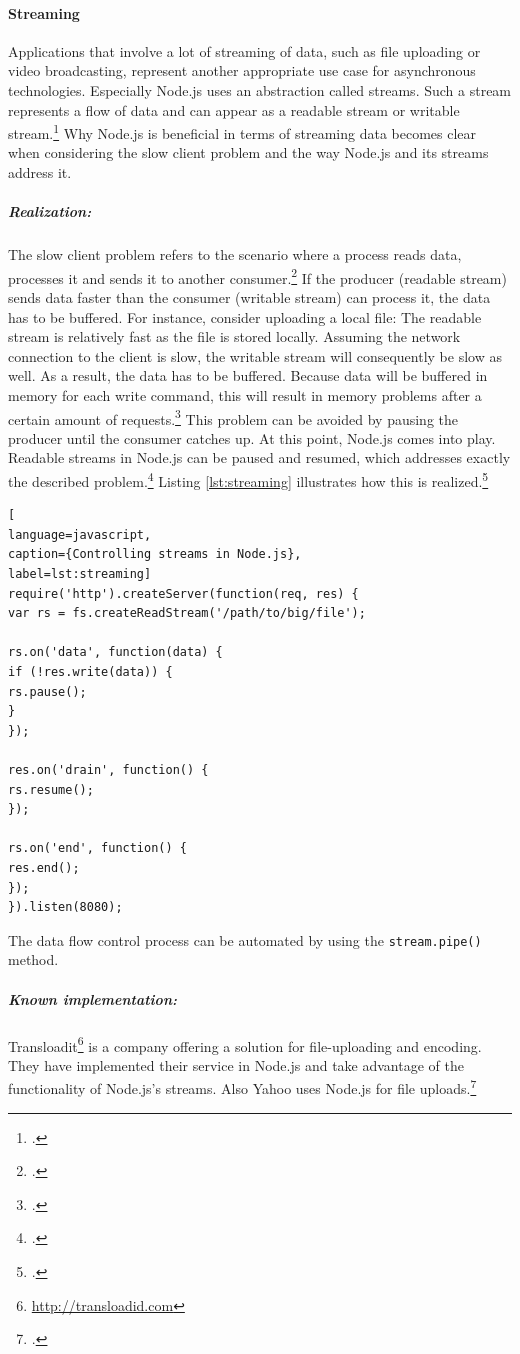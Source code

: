\paragraph{Streaming} Applications that involve a lot of streaming of data, such
as file uploading or video broadcasting, represent another appropriate use
case for asynchronous technologies. Especially Node.js uses an abstraction
called streams. Such a stream represents a flow of data and can appear as a
readable stream or writable stream.\footcite[Cf.][75]{teixeira_2012} Why
Node.js is beneficial in terms of streaming data becomes clear when
considering the slow client problem and the way Node.js and its streams
address it.
\subparagraph{Realization:} The slow client problem refers to the scenario where a
process reads data, processes it and sends it to another consumer.\footcite[Cf.][80]{teixeira_2012}
If the producer (readable stream) sends data faster than the consumer (writable stream)
can process it, the data has to be buffered. For instance, consider uploading
a local file: The readable stream is relatively fast as the file is stored locally.
Assuming the network connection to the client is slow, the writable stream will consequently
be slow as well. As a result, the data has to be buffered. Because data will be buffered in
memory for each write command, this will result in memory problems after a certain amount of
requests.\footcite[Cf.][81]{teixeira_2012} This problem can be avoided by pausing the producer
until the consumer catches up. At this point, Node.js comes into play. Readable streams
in Node.js can be paused and resumed, which addresses exactly the described
problem.\footcite[Cf.][81]{teixeira_2012} Listing \ref{lst:streaming} illustrates
how this is realized.\footcite[Cf.][81]{teixeira_2012}

\begin{lstlisting}[
language=javascript,
caption={Controlling streams in Node.js},
label=lst:streaming]
require('http').createServer(function(req, res) {
var rs = fs.createReadStream('/path/to/big/file');

rs.on('data', function(data) {
if (!res.write(data)) {
rs.pause();
}
});

res.on('drain', function() {
rs.resume();
});

rs.on('end', function() {
res.end();
});
}).listen(8080);
\end{lstlisting}


The data flow control process can be automated by using the
\texttt{stream.pipe()} method.
\subparagraph{Known implementation:}
Transloadit\footnote{\url{http://transloadid.com}} is a company offering a
solution for file-uploading and encoding. They have implemented their service
in Node.js and take advantage of the functionality of Node.js’s streams. Also
Yahoo uses Node.js for file uploads.\footcite[Cf.][]{Odell_2012}


